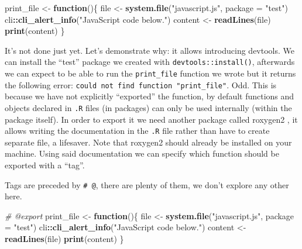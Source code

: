 \documentclass[
]{krantz}
\makeatletter
\newenvironment{Shaded}{\begin{snugshade}}{\end{snugshade}}
\newcommand{\CommentTok}[1]{\textcolor[rgb]{0.37,0.37,0.37}{\textit{#1}}}
\newcommand{\ControlFlowTok}[1]{\textcolor[rgb]{0.27,0.27,0.27}{\textbf{#1}}}
\newcommand{\DataTypeTok}[1]{\textcolor[rgb]{0.27,0.27,0.27}{#1}}
\newcommand{\KeywordTok}[1]{\textcolor[rgb]{0.27,0.27,0.27}{\textbf{#1}}}
\newcommand{\NormalTok}[1]{#1}
\newcommand{\OperatorTok}[1]{\textcolor[rgb]{0.43,0.43,0.43}{\textbf{#1}}}
\newcommand{\StringTok}[1]{\textcolor[rgb]{0.5,0.5,0.5}{#1}}
\newenvironment{kframe}{%
\medskip{}
\setlength{\fboxsep}{.8em}
 \def\at@end@of@kframe{}%
 \ifinner\ifhmode%
  \def\at@end@of@kframe{\end{minipage}}%
  \begin{minipage}{\columnwidth}%
 \fi\fi%
 \def\FrameCommand##1{\hskip\@totalleftmargin \hskip-\fboxsep
 \colorbox{shadecolor}{##1}\hskip-\fboxsep
     \hskip-\linewidth \hskip-\@totalleftmargin \hskip\columnwidth}%
 \MakeFramed {\advance\hsize-\width
   \@totalleftmargin\z@ \linewidth\hsize
   \@setminipage}}%
 {\par\unskip\endMakeFramed%
 \at@end@of@kframe}
\renewenvironment{Shaded}{\begin{kframe}}{\end{kframe}}
\makeatother
\begin{document}
\begin{Shaded}
\begin{Highlighting}[]
\NormalTok{print\_file <{-}}\StringTok{ }\ControlFlowTok{function}\NormalTok{()\{}
\NormalTok{  file <{-}}\StringTok{ }\KeywordTok{system.file}\NormalTok{(}\StringTok{"javascript.js"}\NormalTok{, }\DataTypeTok{package =} \StringTok{"test"}\NormalTok{)}
\NormalTok{  cli}\OperatorTok{::}\KeywordTok{cli\_alert\_info}\NormalTok{(}\StringTok{"JavaScript code below."}\NormalTok{)}
\NormalTok{  content <{-}}\StringTok{ }\KeywordTok{readLines}\NormalTok{(file)}
  \KeywordTok{print}\NormalTok{(content)}
\NormalTok{\}}
\end{Highlighting}
\end{Shaded}

It's not done just yet. Let's demonstrate why: it allows introducing devtools. We can install the ``test'' package we created with \texttt{devtools::install()}, afterwards we can expect to be able to run the \texttt{print\_file} function we wrote but it returns the following error: \texttt{could\ not\ find\ function\ "print\_file"}. Odd. This is because we have not explicitly ``exported'' the function, by default functions and objects declared in \texttt{.R} files (in packages) can only be used internally (within the package itself). In order to export it we need another package called roxygen2 \citep{R-roxygen2}, it allows writing the documentation in the \texttt{.R} file rather than have to create separate file, a lifesaver. Note that roxygen2 should already be installed on your machine. Using said documentation we can specify which function should be exported with a ``tag''.

Tags are preceded by \texttt{\#\textquotesingle{}\ @}, there are plenty of them, we don't explore any other here.

\begin{Shaded}
\begin{Highlighting}[]
\CommentTok{\#\textquotesingle{} @export}
\NormalTok{print\_file <{-}}\StringTok{ }\ControlFlowTok{function}\NormalTok{()\{}
\NormalTok{  file <{-}}\StringTok{ }\KeywordTok{system.file}\NormalTok{(}\StringTok{"javascript.js"}\NormalTok{, }\DataTypeTok{package =} \StringTok{"test"}\NormalTok{)}
\NormalTok{  cli}\OperatorTok{::}\KeywordTok{cli\_alert\_info}\NormalTok{(}\StringTok{"JavaScript code below."}\NormalTok{)}
\NormalTok{  content <{-}}\StringTok{ }\KeywordTok{readLines}\NormalTok{(file)}
  \KeywordTok{print}\NormalTok{(content)}
\NormalTok{\}}
\end{Highlighting}
\end{Shaded}
\end{document}
